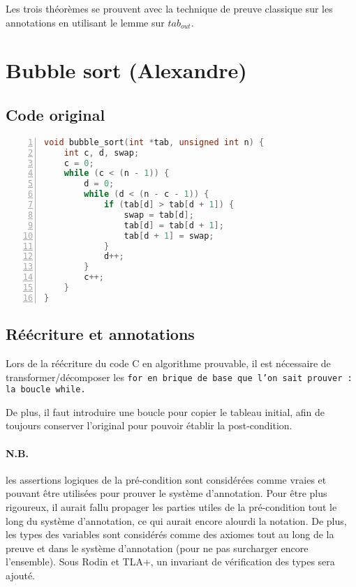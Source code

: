 \documentclass[a4paper, 11pt]{article}
\theoremstyle{mystyle}
\begin{document}
Les trois théorèmes se prouvent avec la technique de preuve classique sur les annotations en utilisant le lemme sur $tab_{out}$.

\clearpage\section{Bubble sort (Alexandre)}

\subsection{Code original}

\begin{lstlisting}[language=c,  basicstyle=\ttfamily\normalsize\color{black!90},
  stringstyle=\color{black!70},
  commentstyle=\itshape\color{black!60},
  identifierstyle=\color{black!90},
  keywordstyle=\color{black!100}\bfseries,
  numberstyle=\ttfamily\small\color{black!50},
  numbers=left,
  numbersep=10pt,
  backgroundcolor=\color{black!1},
  rulecolor=\color{black!30},
  title=\large\ttfamily\lstname,
  breakatwhitespace=true,
  breaklines=false,
  captionpos=b,
  frame=single,
  keepspaces=true,
  showspaces=false,
  showstringspaces=false,
  showtabs=false,
  stepnumber=1,
  tabsize=4,
  numberblanklines=true,
  frameround=tttt,
  belowskip=-1.2\baselineskip,]
void bubble_sort(int *tab, unsigned int n) {
    int c, d, swap;
    c = 0;
    while (c < (n - 1)) {
        d = 0;
        while (d < (n - c - 1)) {
            if (tab[d] > tab[d + 1]) {
                swap = tab[d];
                tab[d] = tab[d + 1];
                tab[d + 1] = swap;
            }
            d++;
        }
        c++;
    }
}
\end{lstlisting}

\subsection{Réécriture et annotations}

Lors de la réécriture du code C en algorithme prouvable, il est nécessaire de transformer/décomposer les \tt{for} en brique de base que l'on sait prouver : la boucle \tt{while}.

De plus, il faut introduire une boucle pour copier le tableau initial, afin de toujours conserver l'original pour pouvoir établir la post-condition.

\paragraph{N.B.} les assertions logiques de la pré-condition sont considérées comme vraies et pouvant être utilisées pour prouver le système d'annotation. Pour être plus rigoureux, il aurait fallu propager les parties utiles de la pré-condition tout le long du système d'annotation, ce qui aurait encore alourdi la notation. De plus, les types des variables sont considérés comme des axiomes tout au long de la preuve et dans le système d'annotation (pour ne pas surcharger encore l'ensemble). Sous Rodin et TLA+, un invariant de vérification des types sera ajouté.
\end{document}

